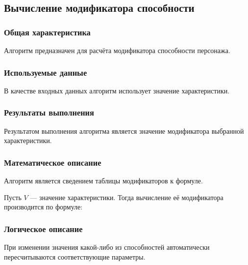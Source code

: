 \subsection{Вычисление модификатора способности}

\subsubsection{Общая характеристика}

Алгоритм предназначен для расчёта модификатора способности персонажа.

\subsubsection{Используемые данные}

В качестве входных данных алгоритм использует значение характеристики.

\subsubsection{Результаты выполнения}

Результатом выполнения алгоритма является значение модификатора выбранной характеристики.

\subsubsection{Математическое описание}

Алгоритм является сведением таблицы модификаторов\cite{PHB} к формуле.

Пусть $V$ --- значение характеристики. Тогда вычисление её модификатора производится по формуле:

\subsubsection{Логическое описание}

При изменении значения какой-либо из способностей автоматически пересчитываются соответствующие параметры.
